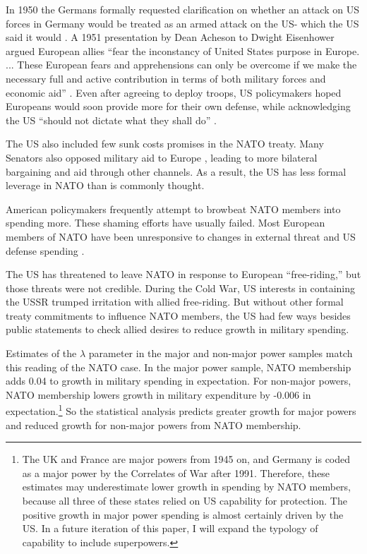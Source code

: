 \documentclass[12pt]{article}
\begin{document}
In 1950 the Germans formally requested clarification on whether an attack on US forces in Germany would be treated as an armed attack on the US- which the US said it would \citep[pg. 395]{Acheson1969}. 
A 1951 presentation by Dean Acheson to Dwight Eisenhower argued European allies ``fear the inconstancy of United States purpose in Europe. ... These European fears and apprehensions can only be overcome if we make the necessary full and active contribution in terms of both military forces and economic aid'' \citep[pg. 3]{Acheson1951}.  
Even after agreeing to deploy troops, US policymakers hoped Europeans would soon provide more for their own defense, while acknowledging the US ``should not dictate what they shall do'' \citep[pg. 2]{Johnson1950}. 


The US also included few sunk costs promises in the NATO treaty. 
Many Senators also opposed military aid to Europe \citep[pg 285]{Acheson1969}, leading to more bilateral bargaining and aid through other channels. 
As a result, the US has less formal leverage in NATO than is commonly thought. 


American policymakers frequently attempt to browbeat NATO members into spending more. 
These shaming efforts have usually failed. 
Most European members of NATO have been unresponsive to changes in external threat and US defense spending \citep{PluemperNeumayer2015}. 


The US has threatened to leave NATO in response to European ``free-riding,'' but those threats were not credible. 
During the Cold War, US interests in containing the USSR trumped irritation with allied free-riding.  
But without other formal treaty commitments to influence NATO members, the US had few ways besides public statements to check allied desires to reduce growth in military spending. 


Estimates of the $\lambda$ parameter in the major and non-major power samples match this reading of the NATO case. 
In the major power sample, NATO membership adds 0.04 to growth in military spending in expectation.
For non-major powers, NATO membership lowers growth in military expenditure by -0.006 in expectation.\footnote{
The UK and France are major powers from 1945 on, and Germany is coded as a major power by the Correlates of War after 1991. Therefore, these estimates may underestimate lower growth in spending by NATO members, because all three of these states relied on US capability for protection. The positive growth in major power spending is almost certainly driven by the US. In a future iteration of this paper, I will expand the typology of capability to include superpowers.
}
So the statistical analysis predicts greater growth for major powers and reduced growth for non-major powers from NATO membership.  
\end{document}
